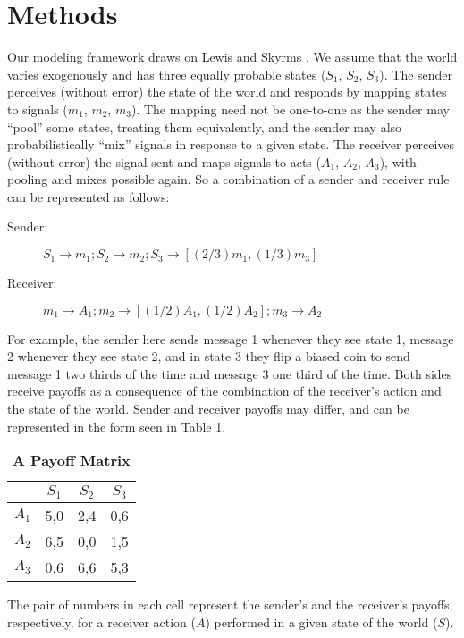 \documentclass[10pt]{article}
\begin{document}
\section*{Methods}

Our modeling framework draws on Lewis \cite{Lewis1969} and Skyrms
\cite{Skyrms2010}. We assume that the world varies exogenously and has
three equally probable states ($S_{1}$, $S_{2}$,
$S_{3}$). The sender perceives (without error) the state of
the world and responds by mapping states to signals ($m_{1}$,
$m_{2}$, $m_{3}$). The mapping need not be
one-to-one as the sender may ``pool'' some states, treating them
equivalently, and the sender may also probabilistically ``mix'' signals
in response to a given state. The receiver perceives (without error) the
signal sent and maps signals to acts ($A_{1}$,
$A_{2}$, $A_{3}$), with pooling and mixes possible
again. So a combination of a sender and receiver rule can be represented
as follows:

\begin{description}
\item[Sender:]
$S_1\rightarrow m_1;S_2\rightarrow m_2;S_3\rightarrow \left[(2/3)m_1, (1/3)m_3\right]$
\item[Receiver:]
$m_1\rightarrow A_1; m_2\rightarrow \left[(1/2)A_1, (1/2)A_2\right]; m_3\rightarrow A_2$
\end{description}

For example, the sender here sends message 1 whenever they see state 1,
message 2 whenever they see state 2, and in state 3 they flip a biased
coin to send message 1 two thirds of the time and message 3 one third of
the time. Both sides receive payoffs as a consequence of the combination
of the receiver's action and the state of the world. Sender and receiver
payoffs may differ, and can be represented in the form seen in Table 1.

\begin{table}[!ht]
\caption{
\bf{A Payoff Matrix}}
\begin{tabular}{|c||c|c|c|}
& $S_{1}$ & $S_{2}$ & $S_{3}$ \\
\hline
$A_{1}$ & 5,0 & 2,4 & 0,6 \\
$A_{2}$ & 6,5 & 0,0 & 1,5 \\
$A_{3}$ & 0,6 & 6,6 & 5,3 \\
\end{tabular}
\begin{flushleft}The pair of numbers in each cell represent the sender's and the
receiver's payoffs, respectively, for a receiver action ($A$) performed
in a given state of the world ($S$).
\end{flushleft}
\label{tab:label}
\end{table}
\end{document}
